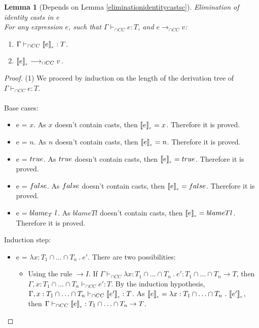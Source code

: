 \documentclass[a4paper]{article}
\newtheorem{lemma}{Lemma}
\begin{document}
\begin{lemma}[Depends on Lemma \ref{eliminationidentitycastsc}]
\label{eliminationidentitycastse}
Elimination of identity casts in e\\
For any expression $e$, such that $\Gamma \vdash_{\cap CC} e : T$, and $e \longrightarrow_{\cap CC} v$:
\begin{enumerate}
    \item $\Gamma \vdash_{\cap CC} \llbracket e \rrbracket_{_e} : T$.
    \item $\llbracket e \rrbracket_{_e} \longrightarrow_{\cap CC} v$.
\end{enumerate}
\end{lemma}
\begin{proof}
(1) We proceed by induction on the length of the derivation tree of $\Gamma \vdash_{\cap CC} e : T$.\\\\
Base cases:
\begin{itemize}
    \item e = $x$.
    As $x$ doesn't contain casts, then $\llbracket e \rrbracket_{_e} = x$.
    Therefore it is proved.
    \item e = $n$.
    As $n$ doesn't contain casts, then $\llbracket e \rrbracket_{_e} = n$.
    Therefore it is proved.
    \item e = $true$.
    As $true$ doesn't contain casts, then $\llbracket e \rrbracket_{_e} = true$.
    Therefore it is proved.
    \item e = $false$.
    As $false$ doesn't contain casts, then $\llbracket e \rrbracket_{_e} = false$.
    Therefore it is proved.
    \item e = $blame_{T}\ l$.
    As $blame{T}{l}$ doesn't contain casts, then $\llbracket e \rrbracket_{_e} = blame{T}{l}$.
    Therefore it is proved.
\end{itemize}
Induction step:
\begin{itemize}
    \item e = $\lambda x : T_1 \cap \ldots \cap T_n\ .\ e'$.
    There are two possibilities:
    \begin{itemize}
        \item Using the rule ${\rightarrow} I$.
        If $\Gamma \vdash_{\cap CC} \lambda x : T_1 \cap \ldots \cap T_n\ .\ e' : T_1 \cap \ldots \cap T_n \rightarrow T$, then $\Gamma, x : T_1 \cap \ldots \cap T_n \vdash_{\cap CC} e' : T$.
        By the induction hypothesis, $\Gamma, x : T_1 \cap \ldots \cap T_n \vdash_{\cap CC} \llbracket e' \rrbracket_{_e} : T$.
        As $\erasee{e} = \lambda x : T_1 \cap \ldots \cap T_n\ .\ \erasee{e'}$, then $\Gamma \vdash_{\cap CC} \llbracket e \rrbracket_{_e} : T_1 \cap \ldots \cap T_n \rightarrow T$.

\end{itemize}
\end{itemize}
\end{proof}
\end{document}
